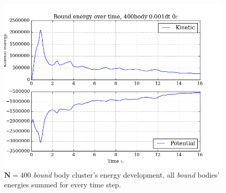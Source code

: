 \documentclass[11pt,a4paper,notitlepage,twocolumn]{article}
\begin{document}
\begin{figure}
[H]\center
\includegraphics[scale=0.35]{../figs/ClusterEnergiesComp_400body_dt1_eps0_dur16.png}
\caption{$\mathbf{N} = 400$ \textit{bound} body cluster's energy development, all \textit{bound} bodies' energies summed for every time step.}
\end{figure}
\end{document}
